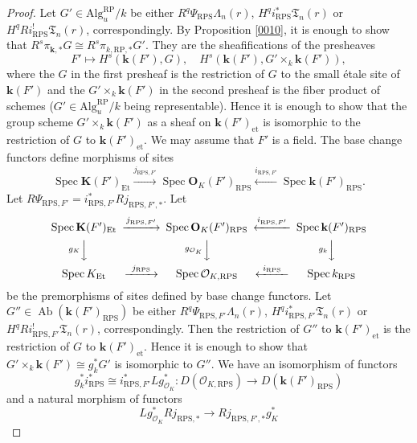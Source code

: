 \documentclass{amsart}
\theoremstyle{remark}
\numberwithin{equation}{section}
\newcommand{\Order}{\mathcal{O}}
\newcommand{\et}{\mathrm{et}}
\newcommand{\Et}{\mathrm{Et}}
\newcommand{\Alg}{\mathrm{Alg}}
\newcommand{\alg}[1]{\mathbf{#1}}
\newcommand{\RP}{\mathrm{RP}}
\newcommand{\RPS}{\mathrm{RPS}}
\DeclareMathOperator{\Spec}{Spec}
\DeclareMathOperator{\Ab}{Ab}
\begin{document}
\begin{proof}
	Let $G' \in \Alg^{\RP}_{u} / k$ be either
	$R^{q} \Psi_{\RPS} \Lambda_{n}(r)$, $H^{q} i_{\RPS}^{\ast} \mathfrak{T}_{n}(r)$
	or $H^{q} R i_{\RPS}^{!} \mathfrak{T}_{n}(r)$, correspondingly.
	By Proposition \ref{0010},
	it is enough to show that
	$R^{s} \pi_{\alg{k}, \ast} G \cong R^{s} \pi_{k, \RP, \ast} G'$.
	They are the sheafifications of the presheaves
		\[
				F'
			\mapsto
					H^{s}(\alg{k}(F'), G),
				\quad
					H^{s}(\alg{k}(F'), G' \times_{k} \alg{k}(F')),
		\]
	where the $G$ in the first presheaf is the restriction of $G$ to the small \'etale site of $\alg{k}(F')$
	and the $G' \times_{k} \alg{k}(F')$ in the second presheaf is
	the fiber product of schemes ($G' \in \Alg^{\RP}_{u} / k$ being representable).
	Hence it is enough to show that
	the group scheme $G' \times_{k} \alg{k}(F')$ as a sheaf on $\alg{k}(F')_{\et}$
	is isomorphic to the restriction of $G$ to $\alg{k}(F')_{\et}$.
	We may assume that $F'$ is a field.
	The base change functors define morphisms of sites
		\[
				\Spec \alg{K}(F')_{\Et}
			\stackrel{j_{\RPS, F'}}{\to}
				\Spec \alg{O}_{K}(F')_{\RPS}
			\stackrel{i_{\RPS, F'}}{\gets}
				\Spec \alg{k}(F')_{\RPS}.
		\]
	Let $R \Psi_{\RPS, F'} = i_{\RPS, F'}^{\ast} R j_{\RPS, F', \ast}$.
	Let
		\[
			\begin{CD}
					\Spec \alg{K}(F')_{\Et}
				@> j_{\RPS, F'} >>
					\Spec \alg{O}_{K}(F')_{\RPS}
				@< i_{\RPS, F'} <<
					\Spec \alg{k}(F')_{\RPS}
				\\
				@V g_{K} VV
				@V g_{\Order_{K}} VV
				@V g_{k} VV
				\\
					\Spec K_{\Et}
				@> j_{\RPS} >>
					\Spec \Order_{K, \RPS}
				@< i_{\RPS} <<
					\Spec k_{\RPS}
			\end{CD}
		\]
	be the premorphisms of sites defined by base change functors.
	Let $G'' \in \Ab(\alg{k}(F')_{\RPS})$ be either
	$R^{q} \Psi_{\RPS, F'} \Lambda_{n}(r)$, $H^{q} i_{\RPS, F'}^{\ast} \mathfrak{T}_{n}(r)$
	or $H^{q} R i_{\RPS, F'}^{!} \mathfrak{T}_{n}(r)$, correspondingly.
	Then the restriction of $G''$ to $\alg{k}(F')_{\et}$
	is the restriction of $G$ to $\alg{k}(F')_{\et}$.
	Hence it is enough to show that $G' \times_{k} \alg{k}(F') \cong g_{k}^{\ast} G'$
	is isomorphic to $G''$.
	We have an isomorphism of functors
		\[
				g_{k}^{\ast} i_{\RPS}^{\ast}
			\cong
				i_{\RPS, F'}^{\ast} L g_{\Order_{K}}^{\ast}
			\colon
				D(\Order_{K, \RPS})
			\to
				D(\alg{k}(F')_{\RPS})
		\]
	and a natural morphism of functors
		\[
				L g_{\Order_{K}}^{\ast} R j_{\RPS, \ast}
			\to
				R j_{\RPS, F', \ast} g_{K}^{\ast}
\]
\end{proof}
\end{document}

